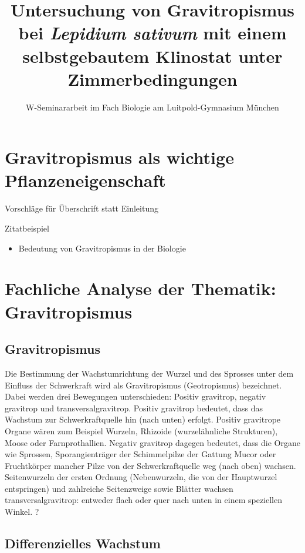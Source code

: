 \documentclass[
a4paper, 
11pt, 
ngerman,
listof=totoc,
bibliography=totocnumbered
]{scrreprt}
\title{Untersuchung von Gravitropismus bei \emph{Lepidium sativum} mit einem selbstgebautem Klinostat unter Zimmerbedingungen}
\subtitle{W-Seminararbeit im Fach Biologie am Luitpold-Gymnasium München}
\begin{document}
\maketitle
\tableofcontents

\chapter{Gravitropismus als wichtige Pflanzeneigenschaft}

Vorschläge für Überschrift statt {\glqq Einleitung\grqq} 

Zitatbeispiel \parencite[29]{campbell}


\begin{itemize}
	\item Bedeutung von Gravitropismus in der Biologie

\end{itemize}

\chapter{Fachliche Analyse der Thematik: Gravitropismus}

\section{Gravitropismus}
Die Bestimmung der Wachstumrichtung der Wurzel und des Sprosses unter dem Einfluss der Schwerkraft wird als Gravitropismus (Geotropismus) bezeichnet. Dabei werden drei Bewegungen unterschieden: Positiv gravitrop, negativ gravitrop und transversalgravitrop. Positiv gravitrop bedeutet, dass das Wachstum zur Schwerkraftquelle hin (nach unten) erfolgt. Positiv gravitrope Organe wären zum Beispiel Wurzeln, Rhizoide (wurzelähnliche Strukturen), Moose oder Farnprothallien. Negativ gravitrop dagegen bedeutet, dass die Organe wie Sprossen, Sporangienträger der Schimmelpilze der Gattung Mucor oder Fruchtkörper mancher Pilze von der Schwerkraftquelle weg (nach oben) wachsen. Seitenwurzeln der ersten Ordnung (Nebenwurzeln, die von der Hauptwurzel entspringen) und zahlreiche Seitenzweige sowie Blätter wachsen transversalgravitrop: entweder flach oder quer nach unten in einem speziellen Winkel. 
\parencite[449]{Strasburger1991} ? 

\section{Differenzielles Wachstum}
\end{document}

